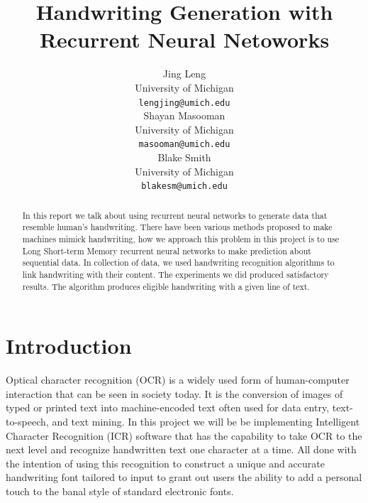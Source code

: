 \documentclass{article} %
\title{Handwriting Generation with Recurrent Neural Netoworks}
\author{
Jing Leng \\
University of Michigan\\
\texttt{lengjing@umich.edu} \\
\And
Shayan Masooman \\
University of Michigan \\
\texttt{masooman@umich.edu} \\
\And
Blake Smith\\
University of Michigan \\
\texttt{blakesm@umich.edu} \\
}
\begin{document}
\maketitle

\begin{abstract}
In this report we talk about using recurrent neural networks to generate data that resemble human's handwriting. There have been various methods proposed to make machines mimick handwriting, how we approach this problem in this project is to use Long Short-term Memory recurrent neural networks to make prediction about sequential data. In collection of data, we used handwriting recognition algorithms to link handwriting with their content. The experiments we did produced satisfactory results. The algorithm produces eligible handwriting with a given line of text. 

\end{abstract}


\section{Introduction}

Optical character recognition (OCR) is a widely used form of human-computer interaction that can be seen in society today. It is the conversion of images of typed or printed text into machine-encoded text often used for data entry, text-to-speech, and text mining. In this project we will be be implementing Intelligent Character Recognition (ICR) software that has the capability to take OCR to the next level and recognize handwritten text one character at a time. All done with the intention of using this recognition to construct a unique and accurate handwriting font tailored to input to grant out users the ability to add a personal touch to the banal style of standard electronic fonts.
\end{document}
